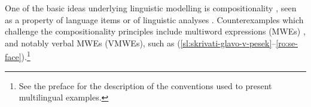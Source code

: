 \documentclass[output=paper,modfonts]{langscibook}
\begin{document}
One of the basic ideas underlying linguistic modelling is compositionality \citep{Baggioetal12}, seen as a property of language items \citep{Janssen01,Parteeetal90} or of linguistic analyses \citep{Kracht07}. 
Counterexamples which challenge the compositionality principles \citep{PaginWesterstahl10b} include multiword expressions (MWEs) \citep{Sag2002a,Kim:2008}%
, and notably 
verbal MWEs (VMWEs), such as (\ref{sl:skrivati-glavo-v-pesek}--\ref{ro:se-face}).\footnote{See the preface for the description of the conventions used to present multilingual examples.}
\end{document}
